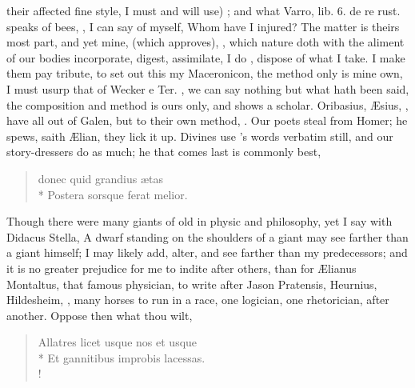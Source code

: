 {their affected fine style, I must and will use) ;
and what Varro, lib. 6. de re rust. speaks of bees, , I can say of myself, Whom
have I injured? The matter is theirs most part, and yet mine,  (which \Seneca approves), , which nature doth with the aliment of our bodies
incorporate, digest, assimilate, I do , dispose of
what I take. I make them pay tribute, to set out this my Maceronicon,
the method only is mine own, I must usurp that of Wecker e Ter.
,
we can say nothing but what hath been said, the composition and method
is ours only, and shows a scholar. Oribasius, \AE{}sius, \Avicenna{}, have
all out of Galen, but to their own method, . Our poets steal from Homer; he spews, saith \AE{}lian, they lick it
up. Divines use \Austin{}'s words verbatim still, and our story-dressers
do as much; he that comes last is commonly best,
%
\begin{verse}
donec quid grandius \ae{}tas\\*
Postera sorsque ferat melior.
\end{verse}

Though there were many giants of old in physic and philosophy, yet I
say with Didacus Stella, A dwarf standing on the shoulders of a
giant may see farther than a giant himself; I may likely add, alter,
and see farther than my predecessors; and it is no greater prejudice
for me to indite after others, than for \AE{}lianus Montaltus, that famous
physician, to write  after Jason Pratensis, Heurnius,
Hildesheim, \etc, many horses to run in a race, one logician, one
rhetorician, after another. Oppose then what thou wilt,

\begin{latin}
\begin{verse}
Allatres licet usque nos et usque\\*
Et gannitibus improbis lacessas.\\!
\end{verse}
\end{latin}

}
